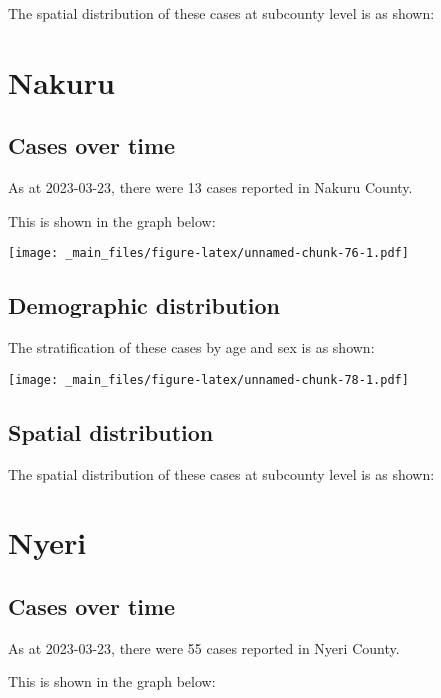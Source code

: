 \documentclass[
]{book}
\begin{document}
The spatial distribution of these cases at subcounty level is as shown:

\hypertarget{nakuru}{%
\chapter{Nakuru}\label{nakuru}}

\hypertarget{cases-over-time-12}{%
\section{Cases over time}\label{cases-over-time-12}}

As at 2023-03-23, there were 13 cases reported in Nakuru County.

This is shown in the graph below:

\texttt{[image: \_main\_files/figure-latex/unnamed-chunk-76-1.pdf]}

\hypertarget{demographic-distribution-12}{%
\section{Demographic distribution}\label{demographic-distribution-12}}

The stratification of these cases by age and sex is as shown:

\texttt{[image: \_main\_files/figure-latex/unnamed-chunk-78-1.pdf]}

\hypertarget{spatial-distribution-12}{%
\section{Spatial distribution}\label{spatial-distribution-12}}

The spatial distribution of these cases at subcounty level is as shown:

\hypertarget{nyeri}{%
\chapter{Nyeri}\label{nyeri}}

\hypertarget{cases-over-time-13}{%
\section{Cases over time}\label{cases-over-time-13}}

As at 2023-03-23, there were 55 cases reported in Nyeri County.

This is shown in the graph below:
\end{document}
